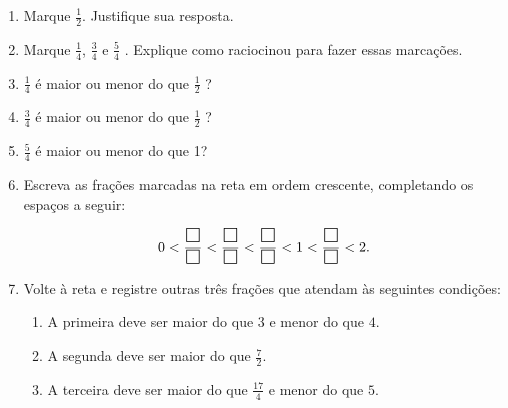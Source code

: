 \documentclass[10 pt,usenames,dvipsnames, oneside]{article}
\begin{document}
\begin{enumerate}
  \item     Marque     $\frac{1}{2}$. Justifique sua resposta.
  \item     Marque     $\frac{1}{4}$,     $\frac{3}{4}$     e     $\frac{5}{4}$    . Explique como raciocinou para fazer essas marcações.

  \item $\frac{1}{4}$     é maior ou menor do que     $\frac{1}{2}$    ?
  \item $\frac{3}{4}$ é maior ou menor do que $\frac{1}{2}$    ?
  \item $\frac{5}{4}$   é maior ou menor do que 1?
  \item Escreva as frações marcadas na reta em ordem crescente, completando os espaços a seguir:

$$0 <  \dfrac{\text{\Large $\square$}}{\text{\Large $\square$}} <  \dfrac{\text{\Large $\square$}}{\text{\Large $\square$}} < \dfrac{\text{\Large $\square$}}{\text{\Large $\square$}} < 1 < \dfrac{\text{\Large $\square$}}{\text{\Large $\square$}}< 2.$$

\item Volte à reta e registre outras três frações que atendam às seguintes condições:
  \begin{enumerate}[label=\Alph*)]
  \item A primeira deve ser maior do que $3$ e menor do que $4$.
 \item A segunda deve ser maior do que $\frac{7}{2}$.
 \item A terceira deve ser maior do que $\frac{17}{4}$ e menor do que $5$.
\end{enumerate}
\end{enumerate} %
\end{document}
